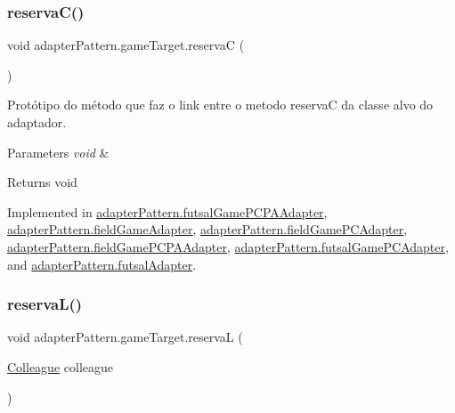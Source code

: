 \subsubsection{\texorpdfstring{reservaC()}{reservaC()}}
{\footnotesize\ttfamily void adapter\+Pattern.\+game\+Target.\+reservaC (\begin{DoxyParamCaption}{ }\end{DoxyParamCaption})}



Protótipo do método que faz o link entre o metodo reservaC da classe alvo do adaptador. 


\begin{DoxyParams}{Parameters}
{\em void} & \\
\hline
\end{DoxyParams}
\begin{DoxyReturn}{Returns}
void 
\end{DoxyReturn}


Implemented in \mbox{\hyperlink{classadapter_pattern_1_1futsal_game_p_c_p_a_adapter_ac19d4edc47f38991cd9a07682f4efc45}{adapter\+Pattern.\+futsal\+Game\+P\+C\+P\+A\+Adapter}}, \mbox{\hyperlink{classadapter_pattern_1_1field_game_adapter_ab9c41ada4fcec05ce596f4de3511723d}{adapter\+Pattern.\+field\+Game\+Adapter}}, \mbox{\hyperlink{classadapter_pattern_1_1field_game_p_c_adapter_a5867b950d86a6c3749bfed3d52fc084c}{adapter\+Pattern.\+field\+Game\+P\+C\+Adapter}}, \mbox{\hyperlink{classadapter_pattern_1_1field_game_p_c_p_a_adapter_ac8b2009b76c2c876592998ddd81a4a20}{adapter\+Pattern.\+field\+Game\+P\+C\+P\+A\+Adapter}}, \mbox{\hyperlink{classadapter_pattern_1_1futsal_game_p_c_adapter_a21ee21ef721544394d4b3986651b7585}{adapter\+Pattern.\+futsal\+Game\+P\+C\+Adapter}}, and \mbox{\hyperlink{classadapter_pattern_1_1futsal_adapter_a154a41741f8c2bda7552797ada4915e3}{adapter\+Pattern.\+futsal\+Adapter}}.

\mbox{\label{interfaceadapter_pattern_1_1game_target_a663405a3d10988de25c6ea3ef63c68eb}} 
\subsubsection{\texorpdfstring{reservaL()}{reservaL()}}
{\footnotesize\ttfamily void adapter\+Pattern.\+game\+Target.\+reservaL (\begin{DoxyParamCaption}\item[{\mbox{\hyperlink{classmediator_pattern_1_1_colleague}{Colleague}}}]{colleague }\end{DoxyParamCaption})}




